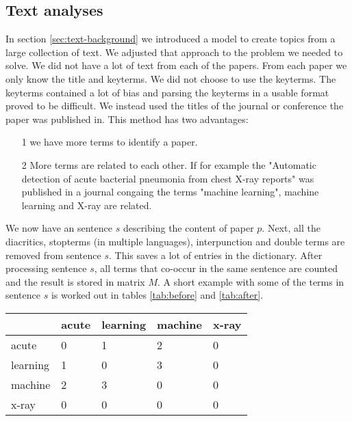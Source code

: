 \subsection*{Text analyses \label{sec:imp-text}}

In section \ref{sec:text-background} we introduced a model to create topics from a large collection of text. We adjusted that approach to the problem we needed to solve. We did not have a lot of text from each of the papers. From each paper we only know the title and keyterms. We did not choose to use the keyterms. The keyterms contained a lot of bias and parsing the keyterms in a usable format proved to be difficult. We instead used the titles of the journal or conference the paper was published in. This method has two advantages:

\begin{itemize}
\item[1] we have more terms to identify a paper.
\item[2] More terms are related to each other. If for example the "Automatic detection of acute bacterial pneumonia from chest X-ray reports" was published in a journal congaing the terms "machine learning",  machine learning and X-ray are related. 
\end{itemize}

We now have an sentence $s$ describing the content of paper $p$. Next, all the diacritics, stopterms (in multiple languages), interpunction and double terms are removed from sentence $s$. This saves a lot of entries in the dictionary\cite{chowdhury2010introduction}. After processing sentence $s$, all terms that co-occur in the same sentence are counted and the result is stored in matrix $M$. A short example with some of the terms in sentence $s$ is worked out in tables \ref{tab:before} and \ref{tab:after}.

\begin{table}
	\begin{center}
	

\begin{tabular}{|l|l|l|l|l|}
\hline
	 	& acute  & learning & machine &  x-ray \\ \hline
acute 	&	0 	& 	1 &	 2 &  0	 \\ \hline
learning&	1	&	0 &	 3 &  0	 \\ \hline
machine &	2	&	3 &	 0 &  0	 \\ \hline
x-ray	&	0	&	0 &	 0 &  0	 \\ \hline

\end{tabular} 
	\end{center}
\end{table}



